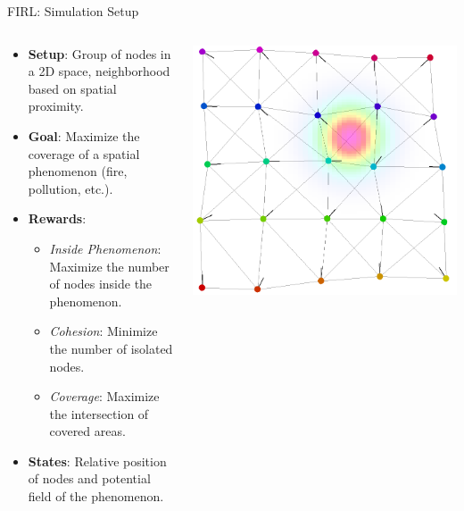 \documentclass[presentation, 8pt,169]{beamer}\mode<presentation>{\usetheme{AMSBolognaFC}}
\begin{document}
\begin{frame}{FIRL: Simulation Setup}

  \begin{columns}
    \begin{column}{0.5\textwidth}  %
        \begin{itemize}
          \item \textbf{Setup}: Group of nodes in a 2D space, neighborhood based on spatial proximity.
          \item \textbf{Goal}: Maximize the coverage of a spatial phenomenon (fire, pollution, etc.).
          \item \textbf{Rewards}: 
            \begin{itemize}
              \item \emph{Inside Phenomenon}: Maximize the number of nodes inside the phenomenon.
              \item \emph{Cohesion}: Minimize the number of isolated nodes.
              \item \emph{Coverage}: Maximize the intersection of covered areas.
            \end{itemize}
          \item \textbf{States}: Relative position of nodes and potential field of the phenomenon.
        \end{itemize}
    \end{column}
    \begin{column}{0.5\textwidth}  %
      \centering
      \includegraphics[width=\textwidth]{img/coverage-setup.png}
    \end{column}
  \end{columns}
\end{frame}
\end{document}
